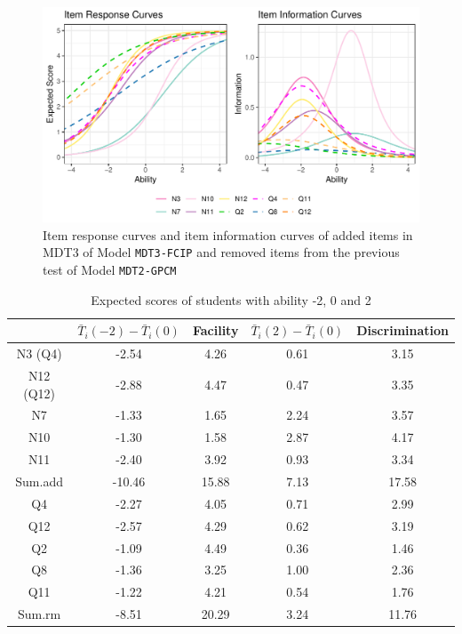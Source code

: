 \documentclass[a4paper]{report}
\begin{document}
\begin{figure}[H]
  \centering
  \includegraphics[width=\linewidth]{fig/IMPRV_FCIP_cf.pdf}
  \caption{\label{fig:IMPRV_FCIP_cf}Item response curves and item information curves of added items in MDT3 of Model \texttt{MDT3-FCIP} and removed items from the previous test of Model \texttt{MDT2-GPCM}}
\end{figure}

\begin{table}[ht]
  \centering
  \begin{tabular}{ccccc}
    \hline
   & $\bar T_i (-2) - \bar T_i (0)$ & Facility & $\bar T_i (2) - \bar T_i (0)$ & Discrimination \\ 
   \hline
   N3 (Q4) & -2.54 & 4.26 & 0.61 & 3.15 \\ 
     N12 (Q12) & -2.88 & 4.47 & 0.47 & 3.35 \\ 
     N7 & -1.33 & 1.65 & 2.24 & 3.57 \\ 
     N10 & -1.30 & 1.58 & 2.87 & 4.17 \\ 
     N11 & -2.40 & 3.92 & 0.93 & 3.34 \\ 
     \hline
     Sum.add & -10.46 & 15.88 & 7.13 & 17.58 \\ 
     \hline
     Q4 & -2.27 & 4.05 & 0.71 & 2.99 \\ 
     Q12 & -2.57 & 4.29 & 0.62 & 3.19 \\ 
     Q2 & -1.09 & 4.49 & 0.36 & 1.46 \\ 
     Q8 & -1.36 & 3.25 & 1.00 & 2.36 \\ 
     Q11 & -1.22 & 4.21 & 0.54 & 1.76 \\ 
     \hline
     Sum.rm & -8.51 & 20.29 & 3.24 & 11.76 \\ 
     \hline
  \end{tabular}
  \caption{\label{tab:IMPRV_FCIP_expscore}Expected scores of students with ability -2, 0 and 2}
\end{table}
\end{document}
